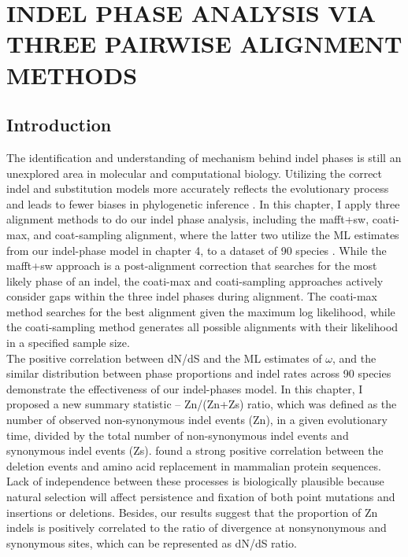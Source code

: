 \chapter{\normalfont  INDEL PHASE ANALYSIS VIA THREE PAIRWISE ALIGNMENT METHODS}
\label{ch:three_aln_methods}

\section{Introduction}
The identification and understanding of mechanism behind indel phases is still an unexplored area in molecular and computational biology. Utilizing the correct indel and substitution models more accurately reflects the evolutionary process and leads to fewer biases in phylogenetic inference \parencite{arenas2015trends}. In this chapter, I apply three alignment methods to do our indel phase analysis, including the mafft+sw, coati-max, and coat-sampling alignment, where the latter two utilize the ML estimates from our indel-phase model in chapter 4, to a dataset of 90 species \parencite{zou2021nonsynonymous}. While the mafft+sw approach is a post-alignment correction that searches for the most likely phase of an indel, the coati-max and coati-sampling approaches actively consider gaps within the three indel phases during alignment. The coati-max method searches for the best alignment given the maximum log likelihood, while the coati-sampling method generates all possible alignments with their likelihood in a specified sample size.\\ 
\indent The positive correlation between dN/dS and the ML estimates of $\omega$, and the similar distribution between phase proportions and indel rates across 90 species demonstrate the effectiveness of our indel-phases model. In this chapter, I proposed a new summary statistic – Zn/(Zn+Zs) ratio, which was defined as the number of observed non-synonymous indel events (Zn), in a given evolutionary time, divided by the total number of non-synonymous indel events and synonymous indel events (Zs). \citeauthor{zheng2018correlated} found a strong positive correlation between the deletion events and amino acid replacement in mammalian protein sequences.  Lack of independence between these processes is biologically plausible because natural selection will affect persistence and fixation of both point mutations and insertions or deletions. Besides, our results suggest that the proportion of Zn indels is positively correlated to the ratio of divergence at nonsynonymous and synonymous sites, which can be represented as dN/dS ratio. 


